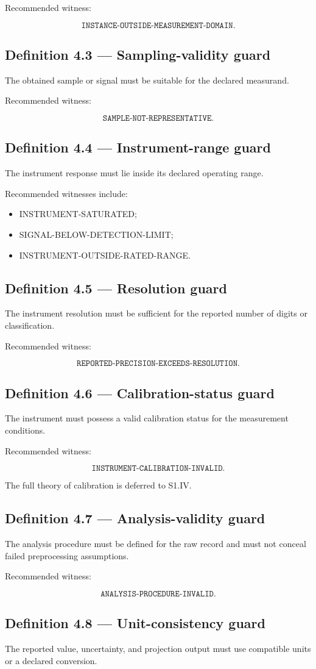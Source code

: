 \documentclass[11pt,oneside,openany]{book}
\newcommand{\PCsubsection}[1]{%
  \subsection*{#1}%
}
\begin{document}
Recommended witness:

\[
\texttt{INSTANCE-OUTSIDE-MEASUREMENT-DOMAIN}.
\]

\PCsubsection{Definition 4.3 --- Sampling-validity guard}

The obtained sample or signal must be suitable for the declared measurand.

Recommended witness:

\[
\texttt{SAMPLE-NOT-REPRESENTATIVE}.
\]

\PCsubsection{Definition 4.4 --- Instrument-range guard}

The instrument response must lie inside its declared operating range.

Recommended witnesses include:

\begin{itemize}
\item INSTRUMENT-SATURATED;
\item SIGNAL-BELOW-DETECTION-LIMIT;
\item INSTRUMENT-OUTSIDE-RATED-RANGE.
\end{itemize}
\PCsubsection{Definition 4.5 --- Resolution guard}

The instrument resolution must be sufficient for the reported number of digits or classification.

Recommended witness:

\[
\texttt{REPORTED-PRECISION-EXCEEDS-RESOLUTION}.
\]

\PCsubsection{Definition 4.6 --- Calibration-status guard}

The instrument must possess a valid calibration status for the measurement conditions.

Recommended witness:

\[
\texttt{INSTRUMENT-CALIBRATION-INVALID}.
\]

The full theory of calibration is deferred to S1.IV.

\PCsubsection{Definition 4.7 --- Analysis-validity guard}

The analysis procedure must be defined for the raw record and must not conceal failed preprocessing assumptions.

Recommended witness:

\[
\texttt{ANALYSIS-PROCEDURE-INVALID}.
\]

\PCsubsection{Definition 4.8 --- Unit-consistency guard}

The reported value, uncertainty, and projection output must use compatible units or a declared conversion.
\end{document}
